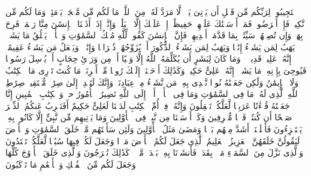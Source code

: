 \stopbuffer
\startbuffer[\q:42:47]
ٱسۡتَجِیبُوا۟ لِرَبِّكُم مِّن قَبۡلِ أَن یَأۡتِیَ یَوۡمࣱ لَّا مَرَدَّ لَهُۥ مِنَ ٱللَّهِۚ مَا لَكُم مِّن مَّلۡجَإࣲ یَوۡمَئِذࣲ وَمَا لَكُم مِّن نَّكِیرࣲ%
\stopbuffer
\startbuffer[\q:42:48]
فَإِنۡ أَعۡرَضُوا۟ فَمَاۤ أَرۡسَلۡنَٰكَ عَلَیۡهِمۡ حَفِیظًاۖ إِنۡ عَلَیۡكَ إِلَّا ٱلۡبَلَٰغُۗ وَإِنَّاۤ إِذَاۤ أَذَقۡنَا ٱلۡإِنسَٰنَ مِنَّا رَحۡمَةࣰ فَرِحَ بِهَاۖ وَإِن تُصِبۡهُمۡ سَیِّئَةُۢ بِمَا قَدَّمَتۡ أَیۡدِیهِمۡ فَإِنَّ ٱلۡإِنسَٰنَ كَفُورࣱ%
\stopbuffer
\startbuffer[\q:42:49]
لِّلَّهِ مُلۡكُ ٱلسَّمَٰوَٰتِ وَٱلۡأَرۡضِۚ یَخۡلُقُ مَا یَشَاۤءُۚ یَهَبُ لِمَن یَشَاۤءُ إِنَٰثࣰا وَیَهَبُ لِمَن یَشَاۤءُ ٱلذُّكُورَ%
\stopbuffer
\startbuffer[\q:42:50]
أَوۡ یُزَوِّجُهُمۡ ذُكۡرَانࣰا وَإِنَٰثࣰاۖ وَیَجۡعَلُ مَن یَشَاۤءُ عَقِیمًاۚ إِنَّهُۥ عَلِیمࣱ قَدِیرࣱ%
\stopbuffer
\startbuffer[\q:42:51]
۞ وَمَا كَانَ لِبَشَرٍ أَن یُكَلِّمَهُ ٱللَّهُ إِلَّا وَحۡیًا أَوۡ مِن وَرَاۤئِ حِجَابٍ أَوۡ یُرۡسِلَ رَسُولࣰا فَیُوحِیَ بِإِذۡنِهِۦ مَا یَشَاۤءُۚ إِنَّهُۥ عَلِیٌّ حَكِیمࣱ%
\stopbuffer
\startbuffer[\q:42:52]
وَكَذَٰلِكَ أَوۡحَیۡنَاۤ إِلَیۡكَ رُوحࣰا مِّنۡ أَمۡرِنَاۚ مَا كُنتَ تَدۡرِی مَا ٱلۡكِتَٰبُ وَلَا ٱلۡإِیمَٰنُ وَلَٰكِن جَعَلۡنَٰهُ نُورࣰا نَّهۡدِی بِهِۦ مَن نَّشَاۤءُ مِنۡ عِبَادِنَاۚ وَإِنَّكَ لَتَهۡدِیۤ إِلَىٰ صِرَٰطࣲ مُّسۡتَقِیمࣲ%
\stopbuffer
\startbuffer[\q:42:53]
صِرَٰطِ ٱللَّهِ ٱلَّذِی لَهُۥ مَا فِی ٱلسَّمَٰوَٰتِ وَمَا فِی ٱلۡأَرۡضِۗ أَلَاۤ إِلَى ٱللَّهِ تَصِیرُ ٱلۡأُمُورُ%
\stopbuffer
\startbuffer[\q:43:1]
حمۤ%
\stopbuffer
\startbuffer[\q:43:2]
وَٱلۡكِتَٰبِ ٱلۡمُبِینِ%
\stopbuffer
\startbuffer[\q:43:3]
إِنَّا جَعَلۡنَٰهُ قُرۡءَٰنًا عَرَبِیࣰّا لَّعَلَّكُمۡ تَعۡقِلُونَ%
\stopbuffer
\startbuffer[\q:43:4]
وَإِنَّهُۥ فِیۤ أُمِّ ٱلۡكِتَٰبِ لَدَیۡنَا لَعَلِیٌّ حَكِیمٌ%
\stopbuffer
\startbuffer[\q:43:5]
أَفَنَضۡرِبُ عَنكُمُ ٱلذِّكۡرَ صَفۡحًا أَن كُنتُمۡ قَوۡمࣰا مُّسۡرِفِینَ%
\stopbuffer
\startbuffer[\q:43:6]
وَكَمۡ أَرۡسَلۡنَا مِن نَّبِیࣲّ فِی ٱلۡأَوَّلِینَ%
\stopbuffer
\startbuffer[\q:43:7]
وَمَا یَأۡتِیهِم مِّن نَّبِیٍّ إِلَّا كَانُوا۟ بِهِۦ یَسۡتَهۡزِءُونَ%
\stopbuffer
\startbuffer[\q:43:8]
فَأَهۡلَكۡنَاۤ أَشَدَّ مِنۡهُم بَطۡشࣰا وَمَضَىٰ مَثَلُ ٱلۡأَوَّلِینَ%
\stopbuffer
\startbuffer[\q:43:9]
وَلَئِن سَأَلۡتَهُم مَّنۡ خَلَقَ ٱلسَّمَٰوَٰتِ وَٱلۡأَرۡضَ لَیَقُولُنَّ خَلَقَهُنَّ ٱلۡعَزِیزُ ٱلۡعَلِیمُ%
\stopbuffer
\startbuffer[\q:43:10]
ٱلَّذِی جَعَلَ لَكُمُ ٱلۡأَرۡضَ مَهۡدࣰا وَجَعَلَ لَكُمۡ فِیهَا سُبُلࣰا لَّعَلَّكُمۡ تَهۡتَدُونَ%
\stopbuffer
\startbuffer[\q:43:11]
وَٱلَّذِی نَزَّلَ مِنَ ٱلسَّمَاۤءِ مَاۤءَۢ بِقَدَرࣲ فَأَنشَرۡنَا بِهِۦ بَلۡدَةࣰ مَّیۡتࣰاۚ كَذَٰلِكَ تُخۡرَجُونَ%
\stopbuffer
\startbuffer[\q:43:12]
وَٱلَّذِی خَلَقَ ٱلۡأَزۡوَٰجَ كُلَّهَا وَجَعَلَ لَكُم مِّنَ ٱلۡفُلۡكِ وَٱلۡأَنۡعَٰمِ مَا تَرۡكَبُونَ%
